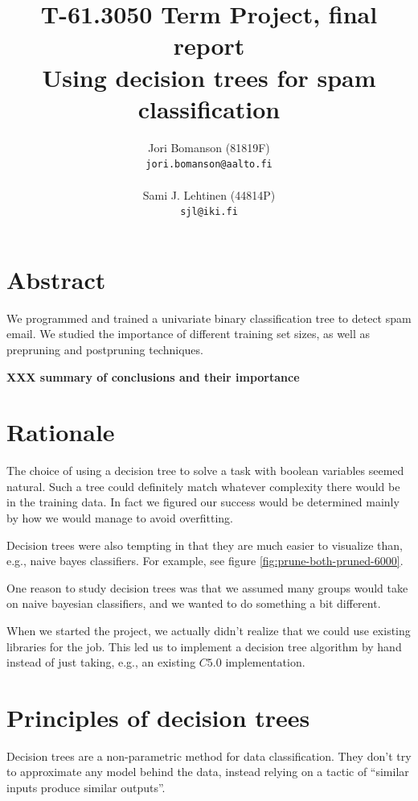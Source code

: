 \documentclass[a4paper,10pt]{article}
\title{T-61.3050 Term Project, final report\\ %
       Using decision trees for spam classification}
\author{Jori Bomanson (81819F) \\
  {\tt jori.bomanson@aalto.fi} \\
  \\
  Sami J. Lehtinen (44814P)\\ 
  {\tt sjl@iki.fi} \\
}
\newcommand{\XXX}[1]{{\bf XXX #1}}
\begin{document}

\maketitle
\thispagestyle{empty}
\pagebreak
{}

\section{Abstract}
We programmed and trained a univariate binary classification tree to detect
spam email. We studied the importance of different training set sizes,
as well as prepruning and postpruning techniques.

\XXX{summary of conclusions and their importance}


\section{Rationale}

The choice of using a decision tree to solve a task with boolean variables
seemed natural. Such a tree could definitely match whatever complexity there
would be in the training data.
In fact we figured our success would be determined mainly by how we would
manage to avoid overfitting.

Decision trees were also tempting in that they are much easier to
visualize than, e.g., naive bayes classifiers.  For example, see
figure \ref{fig:prune-both-pruned-6000}.

One reason to study decision trees was that we assumed many groups would
take on naive bayesian classifiers, and we wanted to do something a bit
different.

When we started the project, we actually didn't realize that we could
use existing libraries for the job.  This led us to implement a decision
tree algorithm by hand instead of just taking, e.g., an existing
$C5.0$\cite{c50} implementation.

\section{Principles of decision trees}

Decision trees are a non-parametric method for data classification.
They don't try to approximate any model behind the data, instead relying
on a tactic of ``similar inputs produce similar outputs''.
\end{document}
